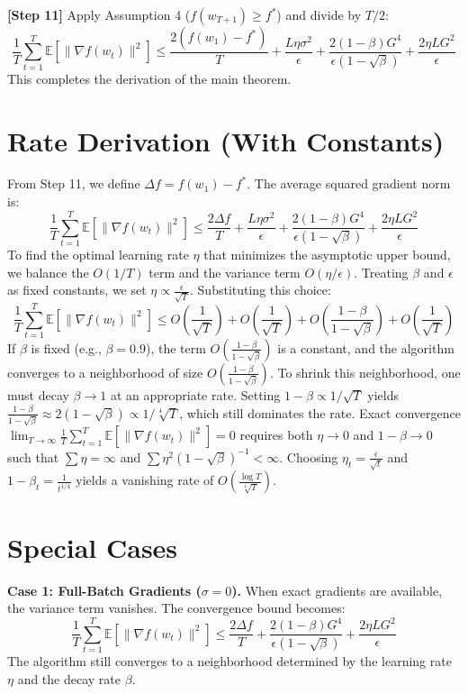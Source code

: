 \documentclass{article}
\begin{document}
\textbf{[Step 11]} Apply Assumption 4 ($f(w_{T+1}) \geq f^*$) and divide by $T/2$:
$$ \frac{1}{T} \sum_{t=1}^T \mathbb{E}[\|\nabla f(w_t)\|^2] \leq \frac{2(f(w_1) - f^*)}{T} + \frac{L\eta\sigma^2}{\epsilon} + \frac{2(1-\beta)G^4}{\epsilon(1-\sqrt{\beta})} + \frac{2\eta L G^2}{\epsilon} $$
This completes the derivation of the main theorem.

\section*{Rate Derivation (With Constants)}
From Step 11, we define $\Delta f = f(w_1) - f^*$. The average squared gradient norm is:
$$ \frac{1}{T} \sum_{t=1}^T \mathbb{E}[\|\nabla f(w_t)\|^2] \leq \frac{2\Delta f}{T} + \frac{L\eta\sigma^2}{\epsilon} + \frac{2(1-\beta)G^4}{\epsilon(1-\sqrt{\beta})} + \frac{2\eta L G^2}{\epsilon} $$
To find the optimal learning rate $\eta$ that minimizes the asymptotic upper bound, we balance the $O(1/T)$ term and the variance term $O(\eta/\epsilon)$. Treating $\beta$ and $\epsilon$ as fixed constants, we set $\eta \propto \frac{\epsilon}{\sqrt{T}}$. Substituting this choice:
$$ \frac{1}{T} \sum_{t=1}^T \mathbb{E}[\|\nabla f(w_t)\|^2] \leq O\left(\frac{1}{\sqrt{T}}\right) + O\left(\frac{1}{\sqrt{T}}\right) + O\left(\frac{1-\beta}{1-\sqrt{\beta}}\right) + O\left(\frac{1}{\sqrt{T}}\right) $$
If $\beta$ is fixed (e.g., $\beta = 0.9$), the term $O\left(\frac{1-\beta}{1-\sqrt{\beta}}\right)$ is a constant, and the algorithm converges to a neighborhood of size $O\left(\frac{1-\beta}{1-\sqrt{\beta}}\right)$. To shrink this neighborhood, one must decay $\beta \to 1$ at an appropriate rate. Setting $1-\beta \propto 1/\sqrt{T}$ yields $\frac{1-\beta}{1-\sqrt{\beta}} \approx 2(1-\sqrt{\beta}) \propto 1/\sqrt[4]{T}$, which still dominates the rate. Exact convergence $\lim_{T \to \infty} \frac{1}{T} \sum_{t=1}^T \mathbb{E}[\|\nabla f(w_t)\|^2] = 0$ requires both $\eta \to 0$ and $1-\beta \to 0$ such that $\sum \eta = \infty$ and $\sum \eta^2 (1-\sqrt{\beta})^{-1} < \infty$. Choosing $\eta_t = \frac{\epsilon}{\sqrt{t}}$ and $1-\beta_t = \frac{1}{t^{1/4}}$ yields a vanishing rate of $O\left(\frac{\log T}{\sqrt[4]{T}}\right)$.

\section*{Special Cases}
\textbf{Case 1: Full-Batch Gradients ($\sigma = 0$).} When exact gradients are available, the variance term vanishes. The convergence bound becomes:
$$ \frac{1}{T} \sum_{t=1}^T \mathbb{E}[\|\nabla f(w_t)\|^2] \leq \frac{2\Delta f}{T} + \frac{2(1-\beta)G^4}{\epsilon(1-\sqrt{\beta})} + \frac{2\eta L G^2}{\epsilon} $$
The algorithm still converges to a neighborhood determined by the learning rate $\eta$ and the decay rate $\beta$.
\end{document}
